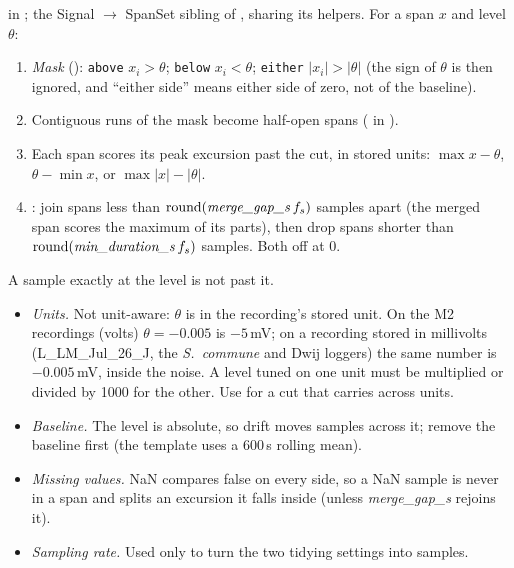  in ; the Signal $\to$ SpanSet sibling
of , sharing its helpers. For a span $x$ and level $\theta$:
\begin{enumerate}
\item \emph{Mask} (): \texttt{above} $x_i > \theta$; \texttt{below}
  $x_i < \theta$; \texttt{either} $|x_i| > |\theta|$ (the sign of $\theta$ is then ignored, and
  ``either side'' means either side of zero, not of the baseline).
\item Contiguous runs of the mask become half-open spans ( in
  ).
\item Each span scores its peak excursion past the cut, in stored units: $\max x - \theta$,
  $\theta - \min x$, or $\max|x| - |\theta|$.
\item {}: join spans less than $\operatorname{round}(\text{\emph{merge\_gap\_s}}\,f_s)$
  samples apart (the merged span scores the maximum of its parts), then drop spans shorter
  than $\operatorname{round}(\text{\emph{min\_duration\_s}}\,f_s)$ samples. Both off at 0.
\end{enumerate}
A sample exactly at the level is not past it.

\begin{itemize}
\item \emph{Units.} Not unit-aware: $\theta$ is in the recording's stored unit. On the M2
  recordings (volts) $\theta = -0.005$ is $-5$\,mV; on a recording stored in millivolts
  (L\_LM\_Jul\_26\_J, the \emph{S.~commune} and Dwij loggers) the same number is $-0.005$\,mV,
  inside the noise. A level tuned on one unit must be multiplied or divided by 1000 for the
  other. Use  for a cut that carries across units.
\item \emph{Baseline.} The level is absolute, so drift moves samples across it; remove the
  baseline first (the template uses a 600\,s rolling mean).
\item \emph{Missing values.} NaN compares false on every side, so a NaN sample is never in a
  span and splits an excursion it falls inside (unless \emph{merge\_gap\_s} rejoins it).
\item \emph{Sampling rate.} Used only to turn the two tidying settings into samples.
\end{itemize}

